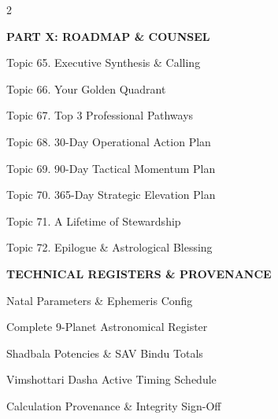 \documentclass[10pt,oneside]{article}
\renewcommand{\textls}[2][60]{#2}
\begin{document}
\begin{multicols}{2}
  \columnbreak

  {\sffamily\fontsize{8.5}{11}\selectfont\bfseries\color{ExecutiveNavy}\textls[60]{PART X: ROADMAP \& COUNSEL}}\par
  \vspace{1mm}
  {\fontsize{8}{11.5}\selectfont
  Topic 65. Executive Synthesis \& Calling \dotfill \pageref*{topic65}\par
  Topic 66. Your Golden Quadrant \dotfill \pageref*{topic66}\par
  Topic 67. Top 3 Professional Pathways \dotfill \pageref*{topic67}\par
  Topic 68. 30-Day Operational Action Plan \dotfill \pageref*{topic68}\par
  Topic 69. 90-Day Tactical Momentum Plan \dotfill \pageref*{topic69}\par
  Topic 70. 365-Day Strategic Elevation Plan \dotfill \pageref*{topic70}\par
  Topic 71. A Lifetime of Stewardship \dotfill \pageref*{topic71}\par
  Topic 72. Epilogue \& Astrological Blessing \dotfill \pageref*{topic72}\par}
  \vspace{2.5mm}

  {\sffamily\fontsize{8.5}{11}\selectfont\bfseries\color{ExecutiveNavy}\textls[60]{TECHNICAL REGISTERS \& PROVENANCE}}\par
  \vspace{1mm}
  {\fontsize{8}{11.5}\selectfont
  Natal Parameters \& Ephemeris Config \dotfill \pageref*{techfoundations}\par
  Complete 9-Planet Astronomical Register \dotfill \pageref*{topic24}\par
  Shadbala Potencies \& SAV Bindu Totals \dotfill \pageref*{topic53}\par
  Vimshottari Dasha Active Timing Schedule \dotfill \pageref*{topic54}\par
  Calculation Provenance \& Integrity Sign-Off \dotfill \pageref*{topic72}\par}
\end{multicols}
\clearpage




\end{document}
